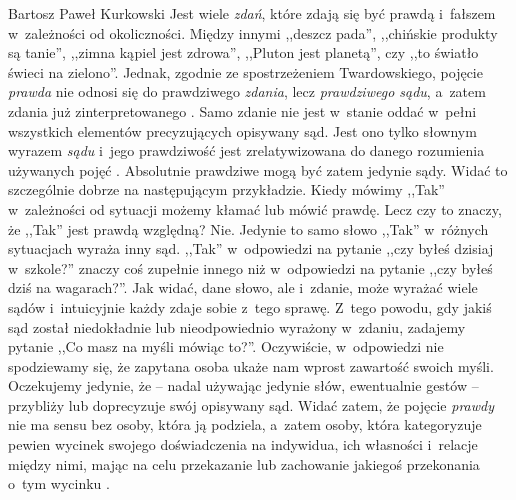 \begin{artplenv}{Bartosz Paweł Kurkowski}
Jest wiele \textit{zdań}, które zdają się być prawdą i~fałszem w~zależności od okoliczności. Między innymi ,,deszcz
pada'', ,,chińskie produkty są tanie'', ,,zimna kąpiel jest zdrowa'', ,,Pluton jest planetą'', czy ,,to światło świeci na
zielono''. Jednak, zgodnie ze spostrzeżeniem Twardowskiego, pojęcie \textit{prawda }nie odnosi się do prawdziwego
\textit{zdania}, lecz \textit{prawdziwego sądu}, a~zatem zdania już zinterpretowanego
\parencite[por.][s.~27]{grobler_prawda_2000}.
Samo zdanie nie jest w~stanie oddać w~pełni wszystkich elementów precyzujących opisywany sąd.
Jest ono tylko słownym wyrazem \textit{sądu} i~jego prawdziwość jest zrelatywizowana do danego rozumienia używanych
pojęć
\parencite[s.~47]{grobler_prawda_2000}.
Absolutnie prawdziwe mogą być zatem jedynie sądy. Widać to
szczególnie dobrze na następującym przykładzie. Kiedy mówimy ,,Tak'' w~zależności od sytuacji możemy kłamać lub mówić
prawdę. Lecz czy to znaczy, że ,,Tak'' jest prawdą względną? Nie. Jedynie to samo słowo ,,Tak'' w~różnych sytuacjach wyraża
inny sąd. ,,Tak'' w~odpowiedzi na pytanie ,,czy byłeś dzisiaj w~szkole?'' znaczy coś zupełnie innego niż w~odpowiedzi na
pytanie ,,czy byłeś dziś na wagarach?''. Jak widać, dane słowo, ale i~zdanie, może wyrażać wiele sądów i~intuicyjnie każdy
zdaje sobie z~tego sprawę. Z~tego powodu, gdy jakiś sąd został niedokładnie lub nieodpowiednio wyrażony w~zdaniu,
zadajemy pytanie ,,Co masz na myśli mówiąc to?''. Oczywiście, w~odpowiedzi nie spodziewamy się, że zapytana osoba ukaże
nam wprost zawartość swoich myśli. Oczekujemy jedynie, że -- nadal używając jedynie słów, ewentualnie gestów -- przybliży
lub doprecyzuje swój opisywany sąd. Widać zatem, że pojęcie \textit{prawdy }nie ma sensu bez osoby, która ją podziela,
a~zatem osoby, która kategoryzuje pewien wycinek swojego doświadczenia na indywidua, ich własności i~relacje między
nimi, mając na celu przekazanie lub zachowanie jakiegoś przekonania o~tym wycinku
\parencite[s.~79]{grobler_prawda_2000}.



\end{artplenv}
